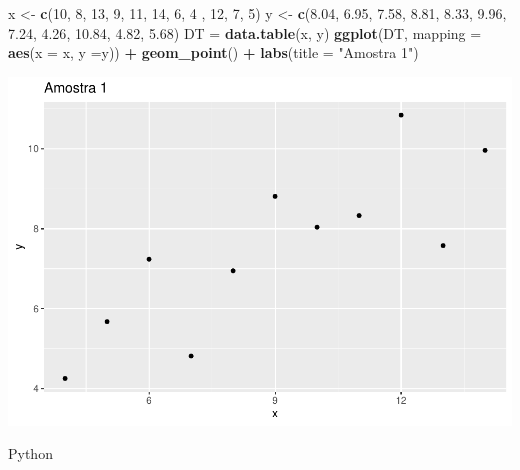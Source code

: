 \documentclass[
]{book}
\newenvironment{Shaded}{\begin{snugshade}}{\end{snugshade}}
\newcommand{\AttributeTok}[1]{\textcolor[rgb]{0.13,0.29,0.53}{#1}}
\newcommand{\DecValTok}[1]{\textcolor[rgb]{0.00,0.00,0.81}{#1}}
\newcommand{\FloatTok}[1]{\textcolor[rgb]{0.00,0.00,0.81}{#1}}
\newcommand{\FunctionTok}[1]{\textcolor[rgb]{0.13,0.29,0.53}{\textbf{#1}}}
\newcommand{\NormalTok}[1]{#1}
\newcommand{\OtherTok}[1]{\textcolor[rgb]{0.56,0.35,0.01}{#1}}
\newcommand{\SpecialCharTok}[1]{\textcolor[rgb]{0.81,0.36,0.00}{\textbf{#1}}}
\newcommand{\StringTok}[1]{\textcolor[rgb]{0.31,0.60,0.02}{#1}}
\begin{document}
\begin{Shaded}
\begin{Highlighting}[]
\NormalTok{x }\OtherTok{\textless{}{-}} \FunctionTok{c}\NormalTok{(}\DecValTok{10}\NormalTok{, }\DecValTok{8}\NormalTok{, }\DecValTok{13}\NormalTok{, }\DecValTok{9}\NormalTok{, }\DecValTok{11}\NormalTok{, }\DecValTok{14}\NormalTok{, }\DecValTok{6}\NormalTok{, }\DecValTok{4}\NormalTok{ , }\DecValTok{12}\NormalTok{, }\DecValTok{7}\NormalTok{, }\DecValTok{5}\NormalTok{)}
\NormalTok{y }\OtherTok{\textless{}{-}} \FunctionTok{c}\NormalTok{(}\FloatTok{8.04}\NormalTok{, }\FloatTok{6.95}\NormalTok{, }\FloatTok{7.58}\NormalTok{, }\FloatTok{8.81}\NormalTok{, }\FloatTok{8.33}\NormalTok{, }\FloatTok{9.96}\NormalTok{, }\FloatTok{7.24}\NormalTok{, }\FloatTok{4.26}\NormalTok{, }\FloatTok{10.84}\NormalTok{, }\FloatTok{4.82}\NormalTok{, }\FloatTok{5.68}\NormalTok{)}
\NormalTok{DT }\OtherTok{=} \FunctionTok{data.table}\NormalTok{(x, y)}
\FunctionTok{ggplot}\NormalTok{(DT, }\AttributeTok{mapping =} \FunctionTok{aes}\NormalTok{(}\AttributeTok{x =}\NormalTok{ x, }\AttributeTok{y =}\NormalTok{y)) }\SpecialCharTok{+}
  \FunctionTok{geom\_point}\NormalTok{() }\SpecialCharTok{+}
  \FunctionTok{labs}\NormalTok{(}\AttributeTok{title =} \StringTok{"Amostra 1"}\NormalTok{)}
\end{Highlighting}
\end{Shaded}

\includegraphics{_main_files/figure-latex/unnamed-chunk-7-1.pdf}

Python
\end{document}

